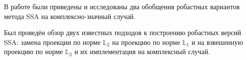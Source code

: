 \documentclass[specialist,
               substylefile = spbu.rtx,
               subf,href,colorlinks=true, 12pt]{disser}
\begin{document}
%
%
%
%
%
%


\newpage
\conclusion
В работе были приведены и исследованы два обобщения робастных вариантов метода SSA на комплексно-значный случай. 

Был проведён обзор двух известных подходов к построению робастных версий SSA: замена проекции по норме $\mathbb{L}_2$ на проекцию по норме $\mathbb{L}_1$ и на взвешенную проекцию по норме $\mathbb{L}_2$ и их имплементация на комплексный случай.

\end{document}
